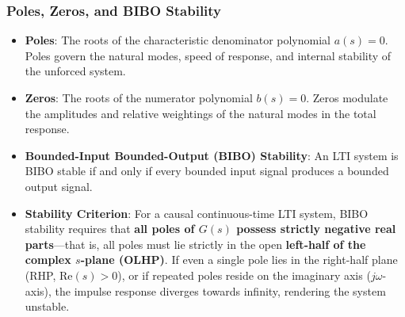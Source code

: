 \documentclass[12pt,onecolumn,twoside ]{article}
\begin{document}
	\subsubsection{Poles, Zeros, and BIBO Stability}
	\begin{itemize}
		\item
		\textbf{Poles}: The roots of the characteristic denominator polynomial $a(s) = 0$. Poles govern the natural modes, speed of response, and internal stability of the unforced system.
		\item
		\textbf{Zeros}: The roots of the numerator polynomial $b(s) = 0$. Zeros modulate the amplitudes and relative weightings of the natural modes in the total response.
		\item
		\textbf{Bounded-Input Bounded-Output (BIBO) Stability}: An LTI system is BIBO stable if and only if every bounded input signal produces a bounded output signal.
		\item
		\textbf{Stability Criterion}: For a causal continuous-time LTI system, BIBO stability requires that \textbf{all poles of $G(s)$ possess strictly negative real parts}—that is, all poles must lie strictly in the open \textbf{left-half of the complex $s$-plane (OLHP)}. If even a single pole lies in the right-half plane (RHP, $\text{Re}(s) > 0$), or if repeated poles reside on the imaginary axis ($j\omega$-axis), the impulse response diverges towards infinity, rendering the system unstable.
	\end{itemize}
	
\end{document}
